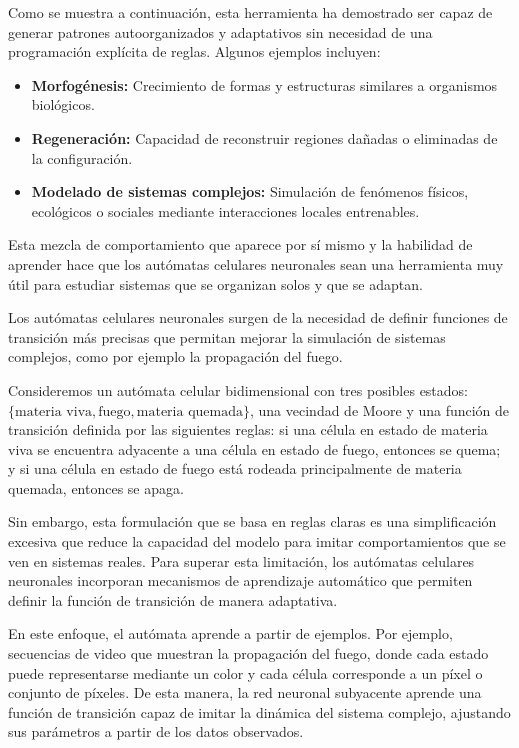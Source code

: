 Como se muestra a continuación, esta herramienta ha demostrado ser capaz de generar patrones autoorganizados y adaptativos sin necesidad de una programación explícita de reglas. Algunos ejemplos incluyen:

\begin{itemize}
	
	\item \textbf{Morfogénesis:} Crecimiento de formas y estructuras similares a organismos biológicos.
	
	\item \textbf{Regeneración:} Capacidad de reconstruir regiones dañadas o eliminadas de la configuración.
	
	\item \textbf{Modelado de sistemas complejos:} Simulación de fenómenos físicos, ecológicos o sociales mediante interacciones locales entrenables.
	
\end{itemize}

Esta mezcla de comportamiento que aparece por sí mismo y la habilidad de aprender hace que los autómatas celulares neuronales sean una herramienta muy útil para estudiar sistemas que se organizan solos y que se adaptan.

Los autómatas celulares neuronales surgen de la necesidad de definir funciones de transición más precisas que permitan mejorar la simulación de sistemas complejos, como por ejemplo la propagación del fuego. 

Consideremos un autómata celular bidimensional con tres posibles estados: $\{ \text{materia viva}, \text{fuego}, \text{materia quemada} \}$, una vecindad de Moore y una función de transición definida por las siguientes reglas: si una célula en estado de materia viva se encuentra adyacente a una célula en estado de fuego, entonces se quema; y si una célula en estado de fuego está rodeada principalmente de materia quemada, entonces se apaga.

Sin embargo, esta formulación que se basa en reglas claras es una simplificación excesiva que reduce la capacidad del modelo para imitar comportamientos que se ven en sistemas reales. Para superar esta limitación, los autómatas celulares neuronales incorporan mecanismos de aprendizaje automático que permiten definir la función de transición de manera adaptativa. 

En este enfoque, el autómata aprende a partir de ejemplos. Por ejemplo, secuencias de video que muestran la propagación del fuego, donde cada estado puede representarse mediante un color y cada célula corresponde a un píxel o conjunto de píxeles. De esta manera, la red neuronal subyacente aprende una función de transición capaz de imitar la dinámica del sistema complejo, ajustando sus parámetros a partir de los datos observados.

